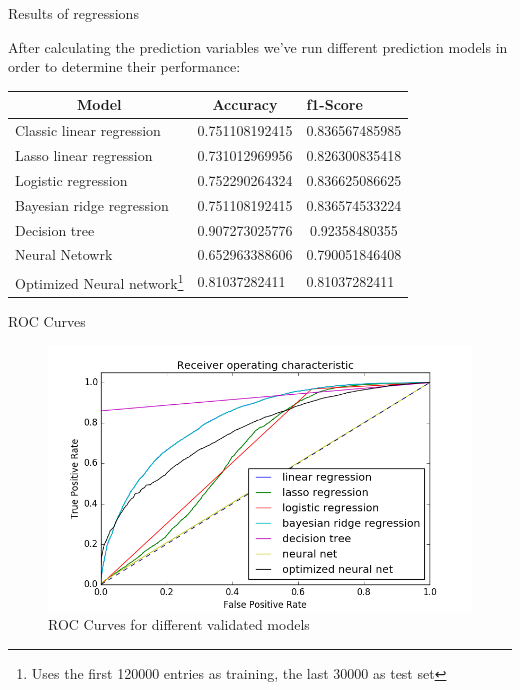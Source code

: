 \documentclass[xcolor=svgnames,handout]{beamer}
\begin{document}
\begin{frame}
  {Results of regressions}

After calculating the prediction variables we've run different prediction  models in order to determine their performance:

\begin{table}[]
\centering
\label{my-label}
\begin{tabular}{lcc}
\multicolumn{1}{c}{\textbf{Model}} & \textbf{Accuracy}                 & \multicolumn{1}{l}{\textbf{f1-Score}} \\ \hline
Classic linear regression          & 0.751108192415                    & 0.836567485985                        \\
Lasso linear regression            & 0.731012969956                    & 0.826300835418                        \\
Logistic regression                & 0.752290264324                    & 0.836625086625                        \\
Bayesian ridge regression          & 0.751108192415                    & 0.836574533224                        \\
Decision tree                      & 0.907273025776                    & 0.92358480355                         \\
Neural Netowrk                     & 0.652963388606                    &   0.790051846408                       \\
Optimized Neural network\footnote{Uses the first 120000 entries as training, the last 30000 as test set}                     & \multicolumn{1}{l}{0.81037282411} & \multicolumn{1}{l}{0.81037282411}    
\end{tabular}
\end{table}

\end{frame}


\begin{frame}
  {ROC Curves}

  \begin{figure}[t]
    \centering
    \includegraphics[height=\dimexpr11\textheight/16\relax]{resources/roc_curves}
    \caption{ROC Curves for different validated models}
  \end{figure}
\end{frame}
\end{document}
